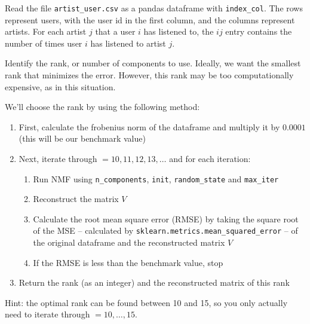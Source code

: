 \begin{problem}
Read the file \texttt{artist\_user.csv} as a pandas dataframe with \texttt{index\_col}.
The rows represent users, with the user id in the first column, and the columns represent artists.
For each artist $j$ that a user $i$ has listened to, the $ij$ entry contains the number of times user $i$ has listened to artist $j$.

Identify the rank, or number of components to use.
Ideally, we want the smallest rank that minimizes the error.
However, this rank may be too computationally expensive, as in this situation.

We'll choose the rank by using the following method:

\begin{enumerate}
  \item First, calculate the frobenius norm of the dataframe and multiply it by $0.0001$ (this will be our benchmark value)
  \item Next, iterate through $=10,11,12,13,\dots$ and for each iteration:
  \begin{enumerate}
    \item Run NMF using \texttt{n\_components}, \texttt{init}, \texttt{random\_state} and \texttt{max\_iter}
    \item Reconstruct the matrix $V$
    \item Calculate the root mean square error (RMSE) by taking the square root of the MSE -- calculated by \texttt{sklearn.metrics.mean\_squared\_error} -- of the original dataframe and the reconstructed matrix $V$
    \item If the RMSE is less than the benchmark value, stop
  \end{enumerate}
  \item Return the rank (as an integer) and the reconstructed matrix of this rank
\end{enumerate}

\noindent Hint: the optimal rank can be found between 10 and 15, so you only actually need to iterate through $=10,\dots,15$.

\label{prob:music_nmf}
\end{problem}

